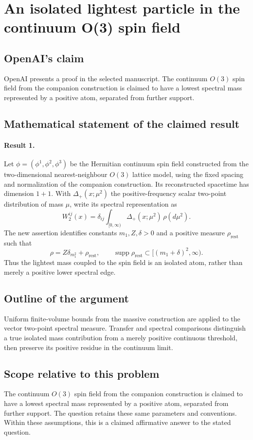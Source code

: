 \documentclass[11pt]{article}
\begin{document}
\section*{An isolated lightest particle in the continuum O(3) spin field}

\subsection{OpenAI's claim}
OpenAI presents a proof in the selected manuscript. The continuum $O(3)$ spin field from the companion construction is claimed to have a lowest spectral mass represented by a positive atom, separated from further support.

\subsection{Mathematical statement of the claimed result}
\paragraph{Result 1.} Let $\phi=(\phi^1,\phi^2,\phi^3)$ be the Hermitian continuum spin field constructed from the two-dimensional nearest-neighbour $O(3)$ lattice model, using the fixed spacing and normalization of the companion construction. Its reconstructed spacetime has dimension $1+1$. With $\Delta_+(x;\mu^2)$ the positive-frequency scalar two-point distribution of mass $\mu$, write its spectral representation as
\[
 W_2^{ij}(x)=\delta_{ij}\int_{[0,\infty)}\Delta_+(x;\mu^2)\,\rho(d\mu^2).
\]
The new assertion identifies constants $m_1,Z,\delta>0$ and a positive measure $\rho_{\mathrm{rest}}$ such that
\[
 \rho=Z\delta_{m_1^2}+\rho_{\mathrm{rest}},\qquad
 \operatorname{supp}\rho_{\mathrm{rest}}\subset[(m_1+\delta)^2,\infty).
\]
Thus the lightest mass coupled to the spin field is an isolated atom, rather than merely a positive lower spectral edge.

\subsection{Outline of the argument}
Uniform finite-volume bounds from the massive construction are applied to the vector two-point spectral measure. Transfer and spectral comparisons distinguish a true isolated mass contribution from a merely positive continuous threshold, then preserve its positive residue in the continuum limit.

\subsection{Scope relative to this problem}
The continuum $O(3)$ spin field from the companion construction is claimed to have a lowest spectral mass represented by a positive atom, separated from further support. The question retains these same parameters and conventions. Within these assumptions, this is a claimed affirmative answer to the stated question.
\end{document}

